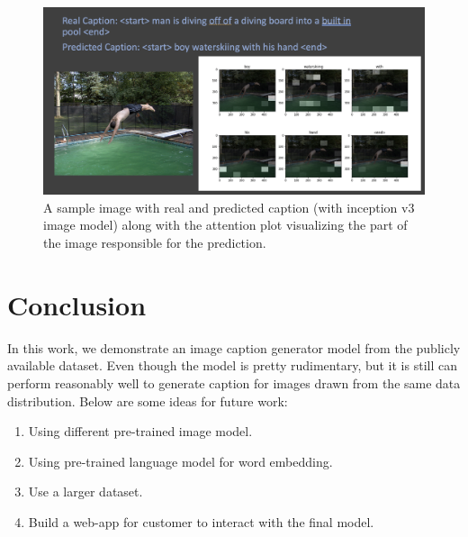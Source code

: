 \documentclass[12pt]{article}
\begin{document}
\begin{figure}[h!]
\begin{center}
\includegraphics[width=7in]{FI_2.png}
\end{center}
\caption{\label{fig:FI_2}
A sample image with real and predicted caption (with inception v3 image model) along with the attention plot visualizing the part of the image responsible for the prediction.}
\end{figure}

\section{Conclusion}
In this work, we demonstrate an image caption generator model from the publicly available dataset. Even though the model is pretty rudimentary, but it is still can perform reasonably well to generate caption for images drawn from the same data distribution. Below are some ideas for future work:

\begin{enumerate}
\item Using different pre-trained image model.
\item Using pre-trained language model for word embedding.
\item Use a larger dataset.
\item Build a web-app for customer to interact with the final model.
\end{enumerate}
\end{document}
